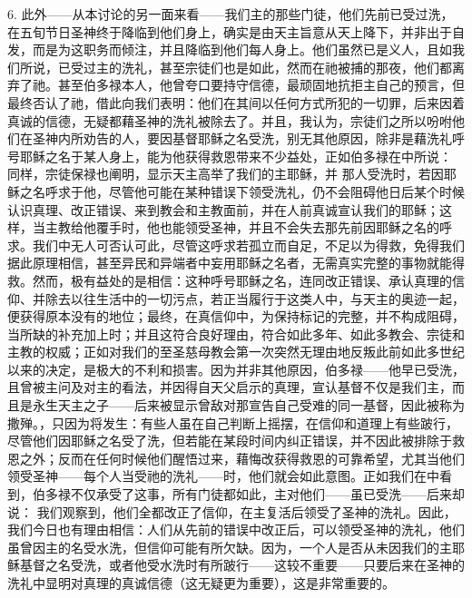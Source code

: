 6. 此外——从本讨论的另一面来看——我们主的那些门徒，他们先前已受过洗，在五旬节日圣神终于降临到他们身上，确实是由天主旨意从天上降下，并非出于自发，而是为这职务而倾注，并且降临到他们每人身上。他们虽然已是义人，且如我们所说，已受过主的洗礼，甚至宗徒们也是如此，然而在祂被捕的那夜，他们都离弃了祂。甚至伯多禄本人，他曾夸口要持守信德，最顽固地抗拒主自己的预言，但最终否认了祂，借此向我们表明：他们在其间以任何方式所犯的一切罪，后来因着真诚的信德，无疑都藉圣神的洗礼被除去了。并且，我认为，宗徒们之所以吩咐他们在圣神内所劝告的人，要因基督耶稣之名受洗，别无其他原因，除非是藉洗礼呼号耶稣之名于某人身上，能为他获得救恩带来不少益处，正如伯多禄在中所说：  同样，宗徒保禄也阐明，显示天主高举了我们的主耶稣，并 那人受洗时，若因耶稣之名呼求于他，尽管他可能在某种错误下领受洗礼，仍不会阻碍他日后某个时候认识真理、改正错误、来到教会和主教面前，并在人前真诚宣认我们的耶稣；这样，当主教给他覆手时，他也能领受圣神，并且不会失去那先前因耶稣之名的呼求。我们中无人可否认可此，尽管这呼求若孤立而自足，不足以为得救，免得我们据此原理相信，甚至异民和异端者中妄用耶稣之名者，无需真实完整的事物就能得救。然而，极有益处的是相信：这种呼号耶稣之名，连同改正错误、承认真理的信仰、并除去以往生活中的一切污点，若正当履行于这类人中，与天主的奥迹一起，便获得原本没有的地位；最终，在真信仰中，为保持标记的完整，并不构成阻碍，当所缺的补充加上时；并且这符合良好理由，符合如此多年、如此多教会、宗徒和主教的权威；正如对我们的至圣慈母教会第一次突然无理由地反叛此前如此多世纪以来的决定，是极大的不利和损害。因为并非其他原因，伯多禄——他早已受洗，且曾被主问及对主的看法，并因得自天父启示的真理，宣认基督不仅是我们主，而且是永生天主之子——后来被显示曾敌对那宣告自己受难的同一基督，因此被称为撒殚。，只因为将发生：有些人虽在自己判断上摇摆，在信仰和道理上有些跛行，尽管他们因耶稣之名受了洗，但若能在某段时间内纠正错误，并不因此被排除于救恩之外；反而在任何时候他们醒悟过来，藉悔改获得救恩的可靠希望，尤其当他们领受圣神——每个人当受祂的洗礼——时，他们就会如此意图。正如我们在中看到，伯多禄不仅承受了这事，所有门徒都如此，主对他们——虽已受洗——后来却说：  我们观察到，他们全都改正了信仰，在主复活后领受了圣神的洗礼。因此，我们今日也有理由相信：人们从先前的错误中改正后，可以领受圣神的洗礼，他们虽曾因主的名受水洗，但信仰可能有所欠缺。因为，一个人是否从未因我们的主耶稣基督之名受洗，或者他受水洗时有所跛行——这较不重要——只要后来在圣神的洗礼中显明对真理的真诚信德（这无疑更为重要），这是非常重要的。\par

